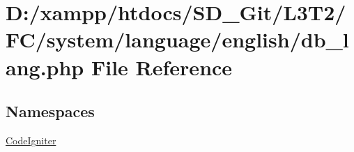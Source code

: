 \hypertarget{system_2language_2english_2db__lang_8php}{}\section{D\+:/xampp/htdocs/\+S\+D\+\_\+\+Git/\+L3\+T2/\+F\+C/system/language/english/db\+\_\+lang.php File Reference}
\label{system_2language_2english_2db__lang_8php}
\subsection*{Namespaces}
\begin{DoxyCompactItemize}
\item 
 \hyperlink{namespace_code_igniter}{Code\+Igniter}
\end{DoxyCompactItemize}
